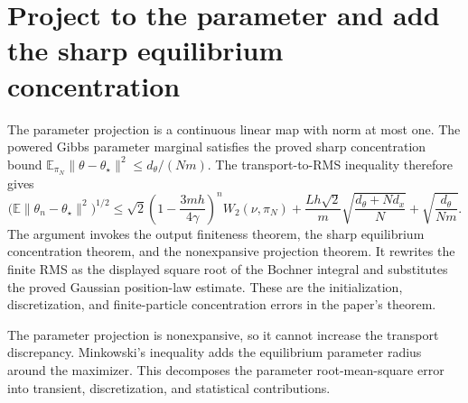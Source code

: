 \documentclass[11pt,a4paper]{article}
\begin{document}
\section{\texorpdfstring{Project to the parameter and add the sharp equilibrium concentration}{Project to the parameter and add the sharp equilibrium concentration}}


The parameter projection is a continuous linear map with norm at most one. The powered Gibbs parameter marginal satisfies the proved sharp concentration bound \(\mathbb E_{\pi_N}\|\theta-\theta_\star\|^2\le d_\theta/(Nm)\). The transport-to-RMS inequality therefore gives \[\bigl(\mathbb E\|\theta_n-\theta_\star\|^2\bigr)^{1/2}\le\sqrt2\left(1-\frac{3mh}{4\gamma}\right)^nW_2(\nu,\pi_N)+\frac{Lh\sqrt2}{m}\sqrt{\frac{d_\theta+Nd_x}{N}}+\sqrt{\frac{d_\theta}{Nm}}.\] The argument invokes the output finiteness theorem, the sharp equilibrium concentration theorem, and the nonexpansive projection theorem. It rewrites the finite RMS as the displayed square root of the Bochner integral and substitutes the proved Gaussian position-law estimate. These are the initialization, discretization, and finite-particle concentration errors in the paper’s theorem.



The parameter projection is nonexpansive, so it cannot increase the transport discrepancy. Minkowski’s inequality adds the equilibrium parameter radius around the maximizer. This decomposes the parameter root-mean-square error into transient, discretization, and statistical contributions.
\end{document}
